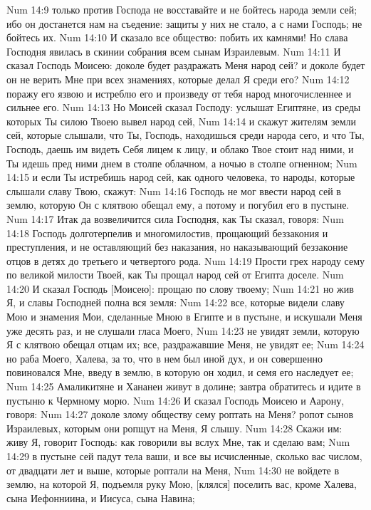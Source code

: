 Num 14:9  только против Господа не восставайте и не бойтесь народа земли сей; ибо он достанется нам на съедение: защиты у них не стало, а с нами Господь; не бойтесь их.
Num 14:10  И сказало все общество: побить их камнями! Но слава Господня явилась в скинии собрания всем сынам Израилевым.
Num 14:11  И сказал Господь Моисею: доколе будет раздражать Меня народ сей? и доколе будет он не верить Мне при всех знамениях, которые делал Я среди его?
Num 14:12  поражу его язвою и истреблю его и произведу от тебя народ многочисленнее и сильнее его.
Num 14:13  Но Моисей сказал Господу: услышат Египтяне, из среды которых Ты силою Твоею вывел народ сей,
Num 14:14  и скажут жителям земли сей, которые слышали, что Ты, Господь, находишься среди народа сего, и что Ты, Господь, даешь им видеть Себя лицем к лицу, и облако Твое стоит над ними, и Ты идешь пред ними днем в столпе облачном, а ночью в столпе огненном;
Num 14:15  и если Ты истребишь народ сей, как одного человека, то народы, которые слышали славу Твою, скажут:
Num 14:16  Господь не мог ввести народ сей в землю, которую Он с клятвою обещал ему, а потому и погубил его в пустыне.
Num 14:17  Итак да возвеличится сила Господня, как Ты сказал, говоря:
Num 14:18  Господь долготерпелив и многомилостив, прощающий беззакония и преступления, и не оставляющий без наказания, но наказывающий беззаконие отцов в детях до третьего и четвертого рода.
Num 14:19  Прости грех народу сему по великой милости Твоей, как Ты прощал народ сей от Египта доселе.
Num 14:20  И сказал Господь [Моисею]: прощаю по слову твоему;
Num 14:21  но жив Я, и славы Господней полна вся земля:
Num 14:22  все, которые видели славу Мою и знамения Мои, сделанные Мною в Египте и в пустыне, и искушали Меня уже десять раз, и не слушали гласа Моего,
Num 14:23  не увидят земли, которую Я с клятвою обещал отцам их; все, раздражавшие Меня, не увидят ее;
Num 14:24  но раба Моего, Халева, за то, что в нем был иной дух, и он совершенно повиновался Мне, введу в землю, в которую он ходил, и семя его наследует ее;
Num 14:25  Амаликитяне и Хананеи живут в долине; завтра обратитесь и идите в пустыню к Чермному морю.
Num 14:26  И сказал Господь Моисею и Аарону, говоря:
Num 14:27  доколе злому обществу сему роптать на Меня? ропот сынов Израилевых, которым они ропщут на Меня, Я слышу.
Num 14:28  Скажи им: живу Я, говорит Господь: как говорили вы вслух Мне, так и сделаю вам;
Num 14:29  в пустыне сей падут тела ваши, и все вы исчисленные, сколько вас числом, от двадцати лет и выше, которые роптали на Меня,
Num 14:30  не войдете в землю, на которой Я, подъемля руку Мою, [клялся] поселить вас, кроме Халева, сына Иефонниина, и Иисуса, сына Навина;
